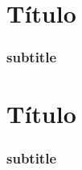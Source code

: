 
\tableofcontents

\section{Título}
\subsubsection{subtitle}

\section{Título}
\subsubsection{subtitle}




